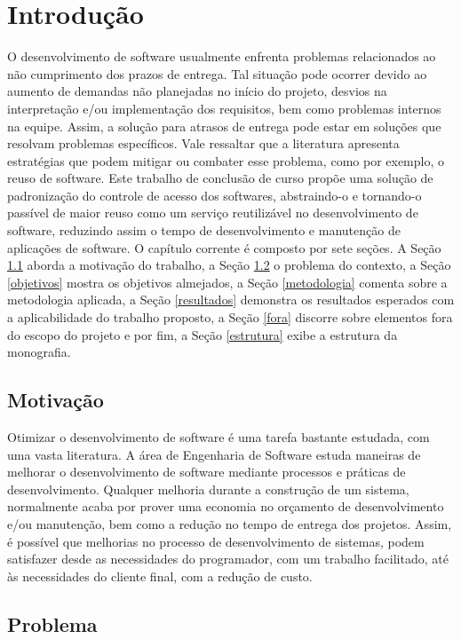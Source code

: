 \chapter{Introdução}


O desenvolvimento de software usualmente enfrenta problemas relacionados ao não cumprimento dos prazos de entrega. Tal situação pode ocorrer devido ao aumento de demandas não planejadas no início do projeto, desvios na interpretação e/ou implementação dos requisitos, bem como problemas internos na equipe. Assim, a solução para atrasos de entrega pode estar em soluções que resolvam problemas específicos. Vale ressaltar que a literatura apresenta estratégias que podem mitigar ou combater esse problema, como por exemplo, o reuso de software. Este trabalho de conclusão de curso propõe uma solução de padronização do controle de acesso dos softwares, abstraindo-o e tornando-o passível de maior reuso como um serviço reutilizável no desenvolvimento de software, reduzindo assim o tempo de desenvolvimento e manutenção de aplicações de software. O capítulo corrente é composto por sete seções. A Seção \ref{motivacao} aborda a motivação do trabalho, a Seção \ref{problema} o problema do contexto, a Seção \ref{objetivos} mostra os objetivos almejados, a Seção \ref{metodologia} comenta sobre a metodologia aplicada, a Seção \ref{resultados} demonstra os resultados esperados com a aplicabilidade do trabalho proposto, a Seção \ref{fora} discorre sobre elementos fora do escopo do projeto e por fim, a Seção \ref{estrutura} exibe a estrutura da monografia.


\section{Motivação}\label{motivacao}


Otimizar o desenvolvimento de software é uma tarefa bastante estudada, com uma vasta literatura. A área de Engenharia de Software estuda maneiras de melhorar o desenvolvimento de software mediante processos e práticas de desenvolvimento. Qualquer melhoria durante a construção de um sistema, normalmente acaba por prover uma economia no orçamento de desenvolvimento e/ou manutenção, bem como a redução no tempo de entrega dos projetos. Assim, é possível que melhorias no processo de desenvolvimento de sistemas, podem satisfazer desde as necessidades do programador, com um trabalho facilitado, até às necessidades do cliente final, com a redução de custo.


\section{Problema}\label{problema} %

